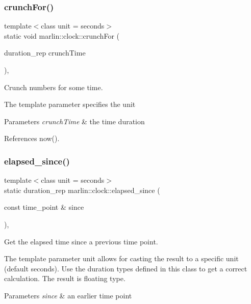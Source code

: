 \subsubsection{crunch\+For()}
{\footnotesize\ttfamily template$<$class unit  = seconds$>$ \\
static void marlin\+::clock\+::crunch\+For (\begin{DoxyParamCaption}\item[{duration\+\_\+rep}]{crunch\+Time }\end{DoxyParamCaption})\hspace{0.3cm}{\ttfamily [inline]}, {\ttfamily [static]}}



Crunch numbers for some time. 

The template parameter specifies the unit


\begin{DoxyParams}{Parameters}
{\em crunch\+Time} & the time duration \\
\hline
\end{DoxyParams}


References now().

\mbox{\label{classmarlin_1_1clock_ad930d69fb21211d094bf8bf5043d597b}} 
\subsubsection{elapsed\+\_\+since()}
{\footnotesize\ttfamily template$<$class unit  = seconds$>$ \\
static duration\+\_\+rep marlin\+::clock\+::elapsed\+\_\+since (\begin{DoxyParamCaption}\item[{const time\+\_\+point \&}]{since }\end{DoxyParamCaption})\hspace{0.3cm}{\ttfamily [inline]}, {\ttfamily [static]}}



Get the elapsed time since a previous time point. 

The template parameter \textquotesingle{}unit\textquotesingle{} allows for casting the result to a specific unit (default seconds). Use the duration types defined in this class to get a correct calculation. The result is floating type.


\begin{DoxyParams}{Parameters}
{\em since} & an earlier time point \\
\hline
\end{DoxyParams}


